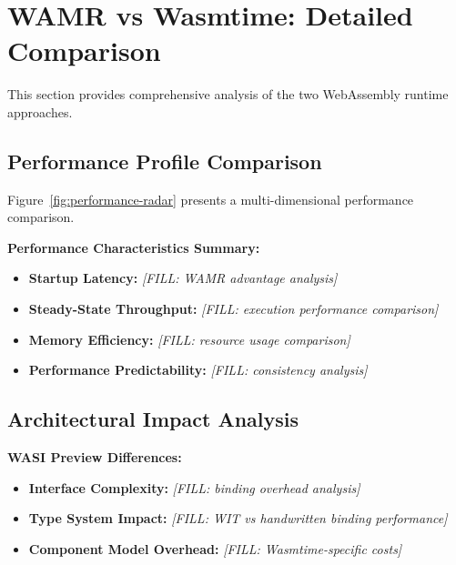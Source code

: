 \section{WAMR vs Wasmtime: Detailed Comparison}
\label{sec:detailed-comparison}

This section provides comprehensive analysis of the two WebAssembly runtime approaches.

\subsection{Performance Profile Comparison}
\label{subsec:performance-profiles}

Figure~\ref{fig:performance-radar} presents a multi-dimensional performance comparison.


\textbf{Performance Characteristics Summary:}
\begin{itemize}
    \item \textbf{Startup Latency:} \textit{[FILL: WAMR advantage analysis]}
    \item \textbf{Steady-State Throughput:} \textit{[FILL: execution performance comparison]}
    \item \textbf{Memory Efficiency:} \textit{[FILL: resource usage comparison]}
    \item \textbf{Performance Predictability:} \textit{[FILL: consistency analysis]}
\end{itemize}

\subsection{Architectural Impact Analysis}
\label{subsec:architectural-impact}

\textbf{WASI Preview Differences:}
\begin{itemize}
    \item \textbf{Interface Complexity:} \textit{[FILL: binding overhead analysis]}
    \item \textbf{Type System Impact:} \textit{[FILL: WIT vs handwritten binding performance]}
    \item \textbf{Component Model Overhead:} \textit{[FILL: Wasmtime-specific costs]}
\end{itemize}

